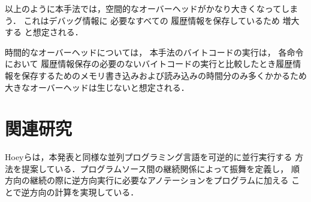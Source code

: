 \documentclass[submit,PRO]{ipsj}
\begin{document}
以上のように本手法では，空間的なオーバーヘッドがかなり大きくなってしまう．%
これはデバッグ情報に%
必要なすべての%
履歴情報を保存しているため%
増大する%
と想定される．

時間的なオーバーヘッドについては，
本手法のバイトコードの実行は，
各命令において%
履歴情報保存の必要のないバイトコードの実行と比較したとき履歴情報を保存するためのメモリ書き込みおよび読み込みの時間分のみ多くかかるため%
大きなオーバーヘッドは生じないと想定される．


\section{関連研究}

Hoeyらは，本発表と同様な並列プログラミング言語を可逆的に並行実行する
方法を提案している．プログラムソース間の継続関係によって振舞を定義し，
順方向の継続の際に逆方向実行に必要なアノテーションをプログラムに加える
ことで逆方向の計算を実現している．


%
%
%
\end{document}
